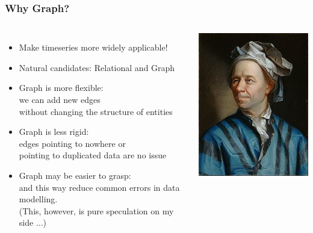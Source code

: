 \documentclass[mathserif,usenames,dvipsnames]{beamer}
\begin{document}
\begin{frame}
\frametitle{Why Graph?}
\begin{columns}[T]
\begin{itemize}
\item Make timeseries more widely applicable!
\item Natural candidates: Relational and Graph
\item Graph is more flexible:\\
      we can add new edges \\
      without changing the structure of entities
\item Graph is less rigid:\\
      edges pointing to nowhere or\\
            pointing to duplicated data are no issue
\item Graph may be easier to grasp:\\
      and this way reduce common errors in data modelling.\\
      (This, however, is pure speculation on my side $\dots$)
\end{itemize}
\vskip1cm
\linewidth
\includegraphics[width=0.75\linewidth]{leoeuler.jpg}
\end{columns}
\end{frame}
\end{document}
